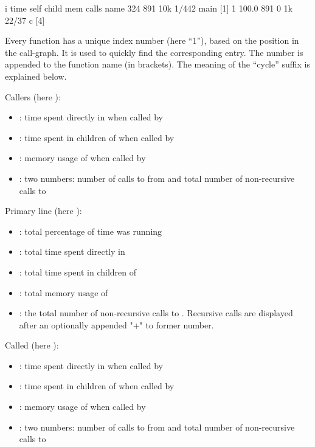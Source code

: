\begin{example}
 i    time self  child  mem    calls   name
            324    891  10k    1/442      main [1]
 1  100.0%
            891      0   1k    22/37      c [4]
\end{example}

Every function has a unique index number  (here ``1''), based on the position in the
call-graph. It is used to quickly find the corresponding entry. The number is appended to
the function name (in brackets).
The meaning of the ``cycle'' suffix is explained below.

Callers (here ):
\begin{itemize}
	\item {}:
		time spent directly in  when called by 
	\item {}:
		time spent in children of  when called by 
	\item {}:
		memory usage of  when called by 
	\item {}:
		two numbers:
		number of calls to  from 
		and
		total number of non-recursive calls to 
\end{itemize}

Primary line (here ):
\begin{itemize}
	\item {}:
		total percentage of time  was running
	\item {}:
		total time spent directly in 
	\item {}:
		total time spent in children of 
	\item {}:
		total memory usage of 
	\item {}:
		the total number of non-recursive calls to . Recursive calls are
		displayed after an optionally appended "+" to former number.
\end{itemize}

Called (here ):
\begin{itemize}
	\item {}:
		time spent directly in  when called by 
	\item {}:
		time spent in children of  when called by 
	\item {}:
		memory usage of  when called by 
	\item {}:
		two numbers:
		number of calls to  from 
		and
		total number of non-recursive calls to 
\end{itemize}

